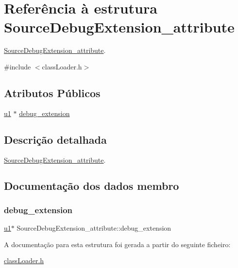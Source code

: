\hypertarget{struct_source_debug_extension__attribute}{}\section{Referência à estrutura Source\+Debug\+Extension\+\_\+attribute}
\label{struct_source_debug_extension__attribute}


\hyperlink{struct_source_debug_extension__attribute}{Source\+Debug\+Extension\+\_\+attribute}.  




{\ttfamily \#include $<$class\+Loader.\+h$>$}

\subsection*{Atributos Públicos}
\begin{DoxyCompactItemize}
\item 
\hyperlink{util_8h_a64f8055b64cf2a4c299c841130c5c938}{u1} $\ast$ \hyperlink{struct_source_debug_extension__attribute_a773848ac1e1a2891a609abf961a7b291}{debug\+\_\+extension}
\end{DoxyCompactItemize}


\subsection{Descrição detalhada}
\hyperlink{struct_source_debug_extension__attribute}{Source\+Debug\+Extension\+\_\+attribute}. 

\subsection{Documentação dos dados membro}
\mbox{\label{struct_source_debug_extension__attribute_a773848ac1e1a2891a609abf961a7b291}} 
\subsubsection{\texorpdfstring{debug\+\_\+extension}{debug\_extension}}
{\footnotesize\ttfamily \hyperlink{util_8h_a64f8055b64cf2a4c299c841130c5c938}{u1}$\ast$ Source\+Debug\+Extension\+\_\+attribute\+::debug\+\_\+extension}



A documentação para esta estrutura foi gerada a partir do seguinte ficheiro\+:\begin{DoxyCompactItemize}
\item 
\hyperlink{class_loader_8h}{class\+Loader.\+h}\end{DoxyCompactItemize}
